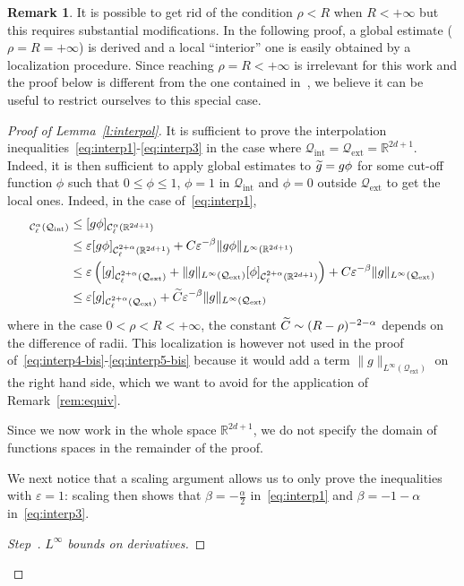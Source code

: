 \documentclass[10pt]{amsart}
\theoremstyle{definition}\newtheorem{defi}[theo]{Definition}\newtheorem{rema}[theo]{Remark}\newtheorem{exam}[theo]{Example}\newtheorem{exem}[theo]{Example}\newtheorem{nota}[theo]{Notation}
\newcommand{\R}{\mathbb{R}}
\newcommand{\cC}{\mathcal{C}}
\newcommand{\cQ}{\mathcal{Q}}
\newcommand{\Qext}{\cQ_{\mathrm{ext}}}
\newcommand{\Qint}{\cQ_{\mathrm{int}}}
\newcommand*\eps{\varepsilon}
\newcounter{stepcount}
\newenvironment{step}[1]{\refstepcounter{stepcount}\begin{proof}[Step~\thestepcount]{\emph{#1}}}{\let\qed\relax\end{proof}}
\let\oldtilde\tilde
\renewcommand*{\tilde}[1]{\mathchoice{\widetilde{#1}}{\widetilde{#1}}{\oldtilde{#1}}{\oldtilde{#1}}}
\begin{document}
\begin{rema}
It is possible to get rid of the condition $\rho < R$ when $R<+\infty$ but this requires substantial modifications. In the following proof, a global estimate ($\rho=R=+\infty$) is derived and a local ``interior'' one is easily obtained by a localization procedure. Since reaching $\rho =R<+\infty$ is irrelevant for this work and the proof below is different from the one contained in~\cite{imbert2018schauder}, we believe it can be useful to restrict ourselves to this special case.
\end{rema}

\begin{proof}[Proof of Lemma~\ref{l:interpol}]
It is sufficient to prove the interpolation inequalities~\eqref{eq:interp1}-\eqref{eq:interp3} in the case where $\Qint = \Qext = \R^{2d+1}$. Indeed, it is then sufficient to apply global estimates to $\tilde g = g \phi$ for some cut-off function $\phi$ such that $0 \le \phi \le 1$, $\phi =1$ in $\Qint$ and $\phi=0$ outside $\Qext$ to get the local ones. Indeed, in the case of~\eqref{eq:interp1},
\begin{align*}
[g]_{\cC^\alpha_\ell (\Qint)} & \le [g \phi]_{\cC^\alpha_\ell \left(\R^{2d+1}\right)} \\
& \le \eps [g \phi]_{\cC_\ell^{2+\alpha}\left(\R^{2d+1}\right)} + C \eps^{-\beta} \|g \phi\|_{L^\infty\left(\R^{2d+1}\right)} \\
& \le \eps \left([g]_{\cC_\ell^{2+\alpha}(\Qext)} + \|g\|_{L^\infty (\Qext)} [\phi]_{\cC_\ell^{2+\alpha}\left(\R^{2d+1}\right)}\right) + C \eps^{-\beta} \|g\|_{L^\infty (\Qext)} \\
& \le \eps [g]_{\cC_\ell^{2+\alpha}(\Qext)} + \tilde{C} \eps^{-\beta} \|g\|_{L^\infty(\Qext)}
\end{align*}
where in the case $0<\rho<R<+\infty$, the constant $\tilde{C} \sim (R-\rho)^{-2-\alpha}$ depends on the difference of radii. This localization is however not used in the proof of~\eqref{eq:interp4-bis}-\eqref{eq:interp5-bis} because it would add a term $\|g\|_{L^\infty(\Qext)}$ on the right hand side, which we want to avoid for the application of Remark~\ref{rem:equiv}.

Since we now work in the whole space $\R^{2d+1}$, we do not specify the domain of functions spaces in the remainder of the proof.

We next notice that a scaling argument allows us to only prove the inequalities with $\eps =1$: scaling then shows that $\beta = - \frac{\alpha}{2}$ in~\eqref{eq:interp1} and $\beta=-1-\alpha$ in~\eqref{eq:interp3}.
\begin{step}{$L^\infty$ bounds on derivatives\label{step1}.}


\end{step}
\end{proof}
\end{document}
